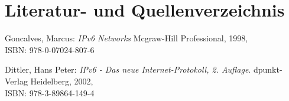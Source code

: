 \documentclass[a4paper,12pt]{scrartcl}
\begin{document}
\clearpage
\section{Literatur- und Quellenverzeichnis}

\renewcommand\refname{Literaturverzeichnis}
\begin{thebibliography}{999}

Goncalves, Marcus:   {\sl IPv6 Networks} Mcgraw-Hill Professional, 1998,
\\ISBN:  978-0-07024-807-6

Dittler, Hans Peter:  {\sl IPv6 - Das neue Internet-Protokoll, 2. Auflage}. dpunkt-Verlag Heidelberg, 2002,
\\ISBN: 978-3-89864-149-4

\end{thebibliography}
\end{document}
